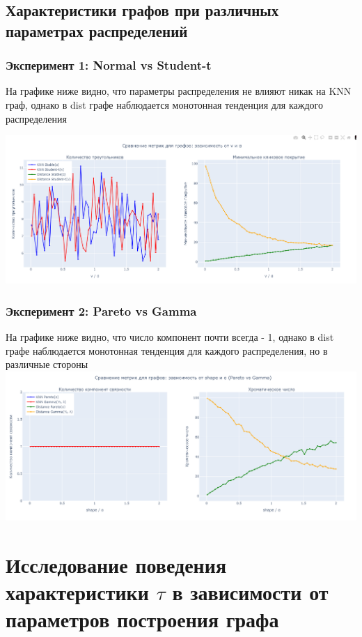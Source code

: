 \documentclass[a4paper,12pt]{report}
\begin{document}
\section{Характеристики графов при различных параметрах распределений}

\subsection{Эксперимент 1: Normal vs Student-t}

На графике ниже видно, что параметры распределения не влияют никак на KNN граф, однако в dist графе наблюдается монотонная тенденция для каждого распределения

\includegraphics[width=1\linewidth]{images/ilin_part1.png}

\subsection{Эксперимент 2: Pareto vs Gamma}

На графике ниже видно, что число компонент почти всегда - 1, однако в dist графе наблюдается монотонная тенденция для каждого распределения, но в различные стороны
\includegraphics[width=1\linewidth]{images/kuleshov_part1.png}

\chapter{Исследование поведения характеристики $\tau$ в зависимости от параметров построения графа}
\end{document}
